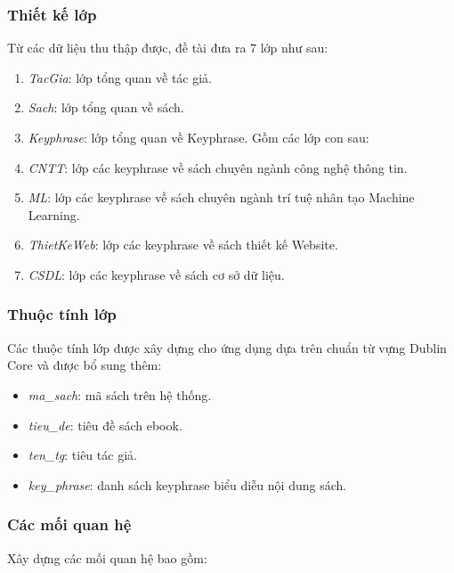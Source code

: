 \subsubsection{Thiết kế lớp}
Từ các dữ liệu thu thập được, đề tài đưa ra 7 lớp như sau:
\begin{enumerate}
    \item \textit{TacGia}: lớp tổng quan về tác giả.
    \item \textit{Sach}: lớp tổng quan về sách.
    \item \textit{Keyphrase}: lớp tổng quan về Keyphrase. Gồm các lớp con sau:
    \item \textit{CNTT}: lớp các keyphrase về sách chuyên ngành công nghệ thông tin.
    \item \textit{ML}: lớp các keyphrase về sách chuyên ngành trí tuệ nhân tạo Machine Learning.
    \item \textit{ThietKeWeb}: lớp các keyphrase về sách thiết kế Website.
    \item \textit{CSDL}: lớp các keyphrase về sách cơ sở dữ liệu.
\end{enumerate}

\subsubsection{Thuộc tính lớp}
Các thuộc tính lớp được xây dựng cho ứng dụng dựa trên chuẩn từ vựng Dublin Core và được bổ sung thêm:


\begin{itemize}
    \item\textit{ma\_sach}: mã sách trên hệ thống.
    \item\textit{tieu\_de}: tiêu đề sách ebook.
    \item\textit{ten\_tg}: tiêu tác giả.
    \item\textit{key\_phrase}: danh sách keyphrase biểu diễu nội dung sách.
\end{itemize}


\subsubsection{Các mối quan hệ}
Xây dựng các mối quan hệ bao gồm:

